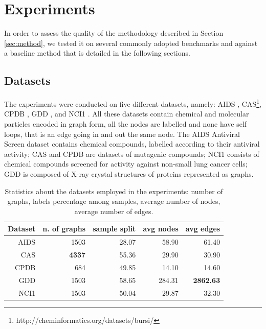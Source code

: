 
\chapter{Experiments}
\label{Chapter4}

In order to assess the quality of the methodology described in Section \ref{sec:method},
we tested it on several commonly adopted benchmarks and against a baseline method
that is detailed in the following sections.

\section{Datasets}
\label{subsec:datasets}

The experiments were conducted on five different datasets, namely:
AIDS \cite{Weislow19041989}, CAS\footnote{http://cheminformatics.org/datasets/bursi/},
CPDB \cite{journals/jcisd/HelmaCKR04}, GDD \cite{dobson2003}, and NCI1 \cite{journals/kais/WaleWK08}.
All these datasets contain chemical and molecular particles encoded in graph form,
all the nodes are labelled and none have self loops, that is an edge going in and 
out the same node.
The AIDS Antiviral Screen dataset contains chemical compounds, labelled according to
their antiviral activity; CAS and CPDB are datasets of mutagenic
compounds; NCI1 consists of chemical compounds screened for activity against 
non-small lung cancer cells; GDD is composed of X-ray crystal structures of
proteins represented as graphs.
    \begin{table}[ht]
        \centering
        \begin{tabular}{|r|r|r|r|r|}
            \hline
            Dataset & n. of graphs & sample split & avg nodes & avg edges \\ \hline
            AIDS    & 1503         & 28.07        & 58.90     & 61.40     \\ \hline      
            CAS     & \textbf{4337} & 55.36        & 29.90     & 30.90     \\ \hline      
            CPDB    &  684         & 49.85        & 14.10     & 14.60     \\ \hline      
            GDD     & 1503         & 58.65        & 284.31    & \textbf{2862.63}   \\ \hline      
            NCI1    & 1503         & 50.04        & 29.87     & 32.30     \\ \hline      
        \end{tabular}
        \caption{Statistics about the datasets employed in the experiments: number
        of graphs, labels percentage among samples, average number of nodes, average
        number of edges.}
        \label{table:datasets}
    \end{table}


